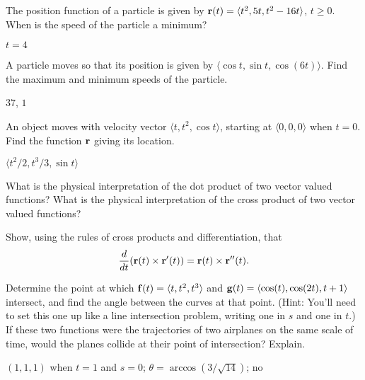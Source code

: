 \begin{theorem}
\begin{exercises}
\begin{exercise}
\begin{exercise} The position function of a particle is given by ${\bf r}(t) =
\langle t^2,5t,t^2-16t\rangle$, $t\geq 0$.  When is the speed of the particle
a minimum?
\begin{answer} $t=4$
\end{answer}\end{exercise}

\item{\question} A particle moves so that its position is given by
$\langle \cos t, \sin t, \cos(6t)\rangle$. Find the maximum and
minimum speeds of the particle.
\begin{answer} $37$, $1$
\end{answer}\end{exercise}

\begin{exercise} An object moves with velocity vector $\langle t, t^2,
\cos t\rangle$, starting at $\langle 0,0,0\rangle$ when $t=0$.
 Find the function
${\bf r}$ giving its location.
\begin{answer} $\langle t^2/2,t^3/3,\sin t\rangle$
\end{answer}\end{exercise}

\begin{exercise} What is the physical interpretation of the dot product of two
  vector valued functions?  What is the physical interpretation of the
  cross product of two vector valued functions?

\begin{exercise} Show, using the rules of cross products and differentiation,
  that
$${d\over dt} ({\bf r}(t) \times {\bf r}'(t))= 
{\bf r}(t) \times {\bf r}''(t).$$

\begin{exercise} Determine the point at which ${\bf f}(t)=\langle t, t^2, t^3
\rangle$ and ${\bf g}(t) =\langle \cos(t), \cos(2t), t+1 \rangle$
intersect, and find the angle between the curves at that point.  (Hint:
You'll need to set this one up like a line intersection problem,
writing one in $s$ and one in $t$.) If these two functions were the
trajectories of two airplanes on the same scale of time, would the
planes collide at their point of intersection?  Explain.
\begin{answer} $(1,1,1)$ when $t=1$ and $s=0$; $\theta=\arccos(3/\sqrt{14})$; no
\end{answer}\end{exercise}


\end{exercise}
\end{exercise}
\end{exercises}
\end{theorem}
